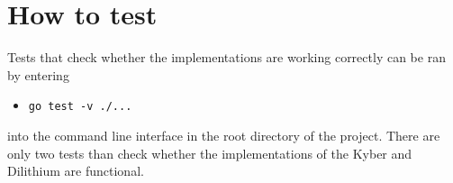 \section{How to test}
Tests that check whether the implementations are working correctly can be ran by entering
\begin{itemize}
  \item \texttt{go test -v ./...}
\end{itemize}
into the command line interface in the root directory of the project. There are only two tests than check whether the implementations of the Kyber and Dilithium are functional.
